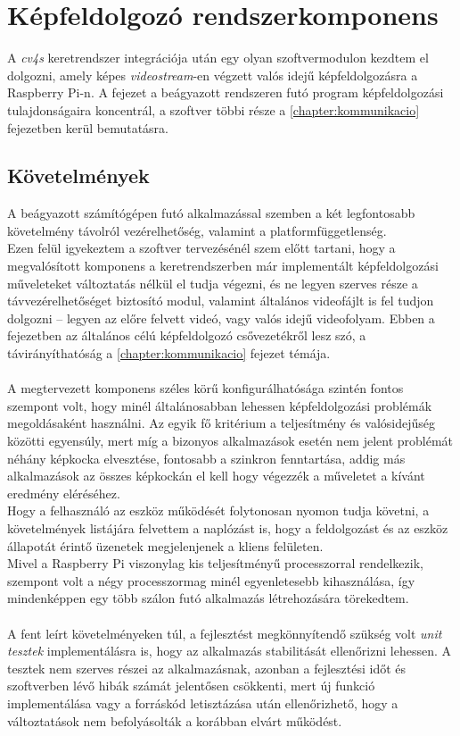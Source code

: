 \chapter{Képfeldolgozó rendszerkomponens} \label{chapter:kepfeldolgozo}

A \emph{cv4s} keretrendszer integrációja után egy olyan szoftvermodulon kezdtem el dolgozni, amely képes \textit{videostream}-en végzett valós idejű képfeldolgozásra a Raspberry Pi-n. A fejezet a beágyazott rendszeren futó program képfeldolgozási tulajdonságaira koncentrál, a szoftver többi része a \ref{chapter:kommunikacio} fejezetben kerül bemutatásra.

\section{Követelmények}

A beágyazott számítógépen futó alkalmazással szemben a két legfontosabb követelmény távolról vezérelhetőség, valamint a platformfüggetlenség. \\
Ezen felül igyekeztem a szoftver tervezésénél szem előtt tartani, hogy a megvalósított komponens a keretrendszerben már implementált képfeldolgozási műveleteket változtatás nélkül el tudja végezni, és ne legyen szerves része a távvezérelhetőséget biztosító modul, valamint általános videofájlt is fel tudjon dolgozni -- legyen az előre felvett videó, vagy valós idejű videofolyam. Ebben a fejezetben az általános célú képfeldolgozó csővezetékről lesz szó, a távirányíthatóság a \ref{chapter:kommunikacio} fejezet témája. \\
\\
A megtervezett komponens széles körű konfigurálhatósága szintén fontos szempont volt, hogy minél általánosabban lehessen képfeldolgozási problémák megoldásaként használni. Az egyik fő kritérium a teljesítmény és valósidejűség közötti egyensúly, mert míg a  bizonyos alkalmazások esetén nem jelent problémát néhány képkocka elvesztése, fontosabb a szinkron fenntartása, addig más alkalmazások az összes képkockán el kell hogy végezzék a műveletet a kívánt eredmény eléréséhez.\\
Hogy a felhasználó az eszköz működését folytonosan nyomon tudja követni, a követelmények listájára felvettem a naplózást is, hogy a feldolgozást és az eszköz állapotát érintő üzenetek megjelenjenek a kliens felületen.\\
Mivel a Raspberry Pi viszonylag kis teljesítményű processzorral rendelkezik, szempont volt a négy processzormag minél egyenletesebb kihasználása, így mindenképpen egy több szálon futó alkalmazás létrehozására törekedtem.\\
\\
A fent leírt követelményeken túl, a fejlesztést megkönnyítendő szükség volt \emph{unit tesztek} implementálásra is, hogy az alkalmazás stabilitását ellenőrizni lehessen. A tesztek nem szerves részei az alkalmazásnak, azonban a fejlesztési időt és szoftverben lévő hibák számát jelentősen csökkenti, mert új funkció implementálása vagy a forráskód letisztázása után ellenőrizhető, hogy a változtatások nem befolyásolták a korábban elvárt működést.

